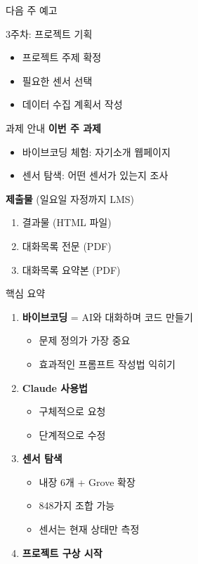 \documentclass[aspectratio=169]{beamer}
\begin{document}
\begin{frame}{다음 주 예고}
  \begin{block}{3주차: 프로젝트 기획}
    \begin{itemize}
      \item 프로젝트 주제 확정
      \item 필요한 센서 선택
      \item 데이터 수집 계획서 작성
    \end{itemize}
  \end{block}
  
  \vspace{1em}
  
  \begin{alertblock}{과제 안내}
    \textbf{이번 주 과제}
    \begin{itemize}
      \item 바이브코딩 체험: 자기소개 웹페이지
      \item 센서 탐색: 어떤 센서가 있는지 조사
    \end{itemize}
    
    \textbf{제출물} (일요일 자정까지 LMS)
    \begin{enumerate}
      \item 결과물 (HTML 파일)
      \item 대화목록 전문 (PDF)
      \item 대화목록 요약본 (PDF)
    \end{enumerate}
  \end{alertblock}
\end{frame}


\begin{frame}{핵심 요약}
  \begin{enumerate}
    \item \textbf{바이브코딩} = AI와 대화하며 코드 만들기
    \begin{itemize}
      \item 문제 정의가 가장 중요
      \item 효과적인 프롬프트 작성법 익히기
    \end{itemize}
    
    \item \textbf{Claude 사용법}
    \begin{itemize}
      \item 구체적으로 요청
      \item 단계적으로 수정
    \end{itemize}
    
    \item \textbf{센서 탐색}
    \begin{itemize}
      \item 내장 6개 + Grove 확장
      \item 848가지 조합 가능
      \item 센서는 현재 상태만 측정
    \end{itemize}
    
    \item \textbf{프로젝트 구상 시작}
  \end{enumerate}
\end{frame}
\end{document}
